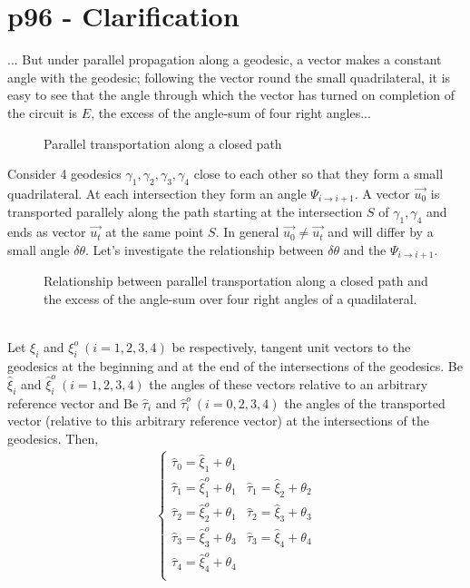 \section{p96 - Clarification}
\begin{tcolorbox}
... But under parallel propagation along a geodesic, a vector makes a constant angle with the geodesic; following the vector round the small quadrilateral, it is easy to see that the angle through which the vector has turned on completion of the circuit is $E$, the excess of the angle-sum of four right angles...
\end{tcolorbox}
\begin{figure}[h]

\caption{Parallel transportation along a  closed path}
\end{figure}
Consider 4 geodesics $\gamma_{1}, \gamma_{2},\gamma_{3},\gamma_{4}$ close to each other so that they form a small quadrilateral. At each intersection they form an angle $\Psi_{i\rightarrow i+1}$. A vector $\overrightarrow{u_{0}}$ is transported parallely along the path starting at the intersection $S$ of $\gamma_{1},\gamma_{4}$ and ends as vector $\overrightarrow{u_{t}}$ at the same point $S$. In general $\overrightarrow{u_{0}}\ne \overrightarrow{u_{t}}$ and will differ by a small angle $\delta\theta$. Let's investigate the relationship between $\delta\theta$ and the $\Psi_{i\rightarrow i+1}$.\\
\begin{figure}[h]

\caption{Relationship between parallel transportation along a closed path and the excess of the angle-sum over four right angles of a quadilateral.}
\end{figure}\\
Let $\xi_{i}$ and $\xi^{o}_{i} \ (i=1,2,3,4)$ be respectively, tangent unit vectors to the  geodesics at the beginning and at the end of the intersections of the geodesics. Be $\widehat{\xi}_{i}$ and $\widehat{\xi}^{o}_{i} \ (i=1,2,3,4)$ the angles of these vectors relative to an arbitrary reference vector and Be $\widehat{\tau}_{i}$ and $\widehat{\tau}^{o}_{i} \ (i=0,2,3,4)$ the angles of the transported vector (relative to this arbitrary reference vector) at the intersections of the geodesics.
Then,
\begin{align}
\left \{ \begin{array}{ll}
\widehat{\tau}_{0} = \widehat{\xi}_{1}+\theta_{1}&\\
\widehat{\tau}_{1} = \widehat{\xi}^{o}_{1}+\theta_{1}&\widehat{\tau}_{1} = \widehat{\xi}_{2}+\theta_{2}\\
\widehat{\tau}_{2} = \widehat{\xi}^{o}_{2}+\theta_{1}&\widehat{\tau}_{2} = \widehat{\xi}_{3}+\theta_{3}\\
\widehat{\tau}_{3} = \widehat{\xi}^{o}_{3}+\theta_{3}&\widehat{\tau}_{3} = \widehat{\xi}_{4}+\theta_{4}\\
\widehat{\tau}_{4} = \widehat{\xi}^{o}_{4}+\theta_{4}&\\
\end{array} \right.
\end{align}
